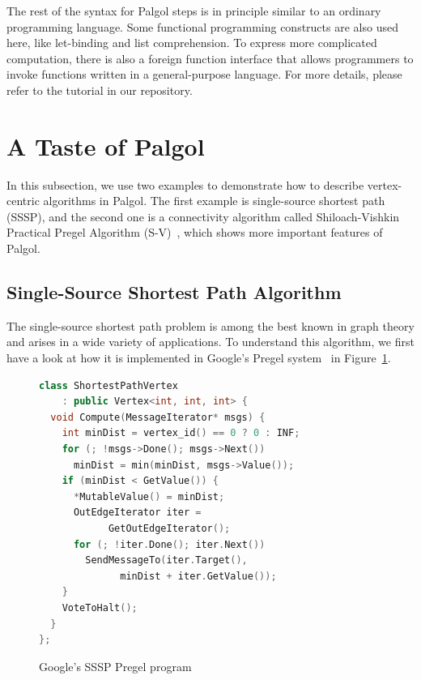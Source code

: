 \documentclass{sokendai_thesis} %
\begin{document}
The rest of the syntax for Palgol steps is in principle similar to an ordinary programming language.
Some functional programming constructs are also used here, like let-binding and list comprehension.
To express more complicated computation, there is also a foreign function interface that allows programmers to invoke functions written in a general-purpose language.
For more details, please refer to the tutorial in our repository.

\section{A Taste of Palgol}
\label{sec:taste}

In this subsection, we use two examples to demonstrate how to describe vertex-centric algorithms in Palgol.
The first example is single-source shortest path (SSSP), and the second one is a connectivity algorithm called Shiloach-Vishkin Practical Pregel Algorithm (S-V)~\cite{connectivity}, which shows more important features of Palgol.

\subsection{Single-Source Shortest Path Algorithm}
\label{sec:sssp}

The single-source shortest path problem is among the best known in graph theory and arises in a wide variety of applications.
To understand this algorithm, we first have a look at how it is implemented in Google's Pregel system~\cite{pregel} in Figure~\ref{fig:sssp-pregel}.
\begin{figure}[thp]
\vspace{-2ex}
\begin{lstlisting}[basicstyle=\small,numbers=none,xleftmargin=0em,language=c++]
class ShortestPathVertex
    : public Vertex<int, int, int> {
  void Compute(MessageIterator* msgs) {
    int minDist = vertex_id() == 0 ? 0 : INF;
    for (; !msgs->Done(); msgs->Next())
      minDist = min(minDist, msgs->Value());
    if (minDist < GetValue()) {
      *MutableValue() = minDist;
      OutEdgeIterator iter = 
            GetOutEdgeIterator();
      for (; !iter.Done(); iter.Next())
        SendMessageTo(iter.Target(),
              minDist + iter.GetValue());
    }
    VoteToHalt();
  }
};
\end{lstlisting}
\vspace{-2ex}
\caption{Google's SSSP Pregel program~\protect\cite{pregel}}
\label{fig:sssp-pregel}
\end{figure}
\end{document}
